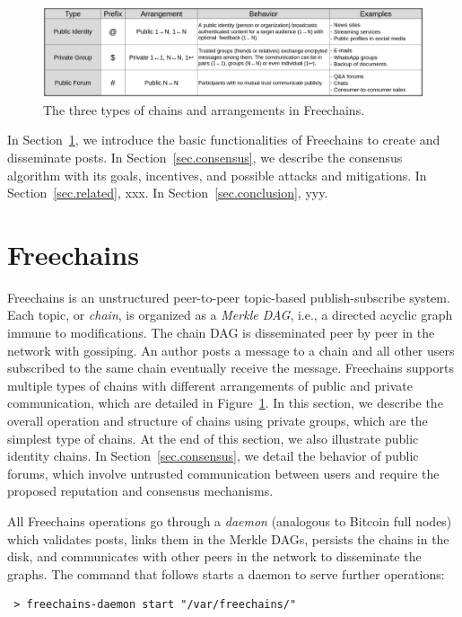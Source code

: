 \documentclass[10pt,journal,compsoc]{IEEEtran}
\newcommand{\FC}   {Freechains\xspace}
\begin{document}
\begin{figure}[ht]
\centering
\includegraphics[width=\textwidth]{arrangements.png}
\caption{The three types of chains and arrangements in \FC.}
\label{fig.table}
\end{figure}

In Section~\ref{sec.freechains}, we introduce the basic functionalities of \FC
to create and disseminate posts.
In Section~\ref{sec.consensus}, we describe the consensus algorithm with its
goals, incentives, and possible attacks and mitigations.
In Section~\ref{sec.related}, xxx.
In Section~\ref{sec.conclusion}, yyy.

\section{Freechains}
\label{sec.freechains}

\FC is an unstructured peer-to-peer topic-based publish-subscribe system.
Each topic, or \emph{chain}, is organized as a \emph{Merkle DAG}, i.e., a
directed acyclic graph immune to modifications.
The chain DAG is disseminated peer by peer in the network with gossiping.
An author posts a message to a chain and all other users subscribed to the same
chain eventually receive the message.
\FC supports multiple types of chains with different arrangements of public and
private communication, which are detailed in Figure~\ref{fig.table}.
In this section, we describe the overall operation and structure of chains
using private groups, which are the simplest type of chains.
At the end of this section, we also illustrate public identity chains.
In Section~\ref{sec.consensus}, we detail the behavior of public forums, which
involve untrusted communication between users and require the proposed
reputation and consensus mechanisms.

All \FC operations go through a \emph{daemon} (analogous to Bitcoin full nodes)
which validates posts, links them in the Merkle DAGs, persists the chains in
the disk, and communicates with other peers in the network to disseminate the
graphs.
The command that follows starts a daemon to serve further operations:

{\footnotesize
\begin{verbatim}
 > freechains-daemon start "/var/freechains/"
\end{verbatim}
}
\end{document}
